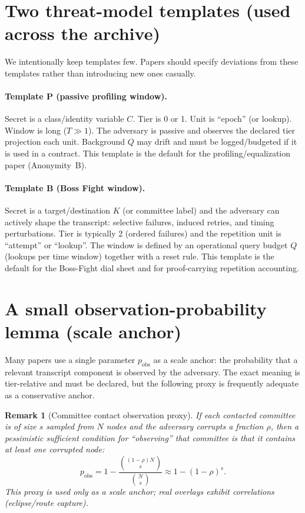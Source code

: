 \documentclass[11pt]{article}
\newtheorem{remark}{Remark}
\begin{document}
\section{Two threat-model templates (used across the archive)}\label{sec:templates}
We intentionally keep templates few.
Papers should specify deviations from these templates rather than introducing new ones casually.

\paragraph{Template P (passive profiling window).}
Secret is a class/identity variable $C$.
Tier is 0 or 1.
Unit is ``epoch'' (or lookup).
Window is long ($T\gg 1$).
The adversary is passive and observes the declared tier projection each unit.
Background $Q$ may drift and must be logged/budgeted if it is used in a contract.
This template is the default for the profiling/equalization paper (Anonymity~B).

\paragraph{Template B (Boss Fight window).}
Secret is a target/destination $K$ (or committee label) and the adversary can actively shape the transcript: selective failures, induced retries, and timing perturbations.
Tier is typically 2 (ordered failures) and the repetition unit is ``attempt'' or ``lookup''.
The window is defined by an operational query budget $Q$ (lookups per time window) together with a reset rule.
This template is the default for the Boss-Fight dial sheet and for proof-carrying repetition accounting.

\section{A small observation-probability lemma (scale anchor)}\label{sec:pobs}
Many papers use a single parameter $p_{\mathrm{obs}}$ as a scale anchor: the probability that a relevant transcript component is observed by the adversary.
The exact meaning is tier-relative and must be declared, but the following proxy is frequently adequate as a conservative anchor.

\begin{remark}[Committee contact observation proxy]
If each contacted committee is of size $s$ sampled from $N$ nodes and the adversary corrupts a fraction $\rho$, then a pessimistic sufficient condition for ``observing'' that committee is that it contains at least one corrupted node:
\[
 p_{\mathrm{obs}} = 1-\frac{\binom{(1-\rho)N}{s}}{\binom{N}{s}} \approx 1-(1-\rho)^s.
\]
This proxy is used only as a scale anchor; real overlays exhibit correlations (eclipse/route capture).
\end{remark}
\end{document}

